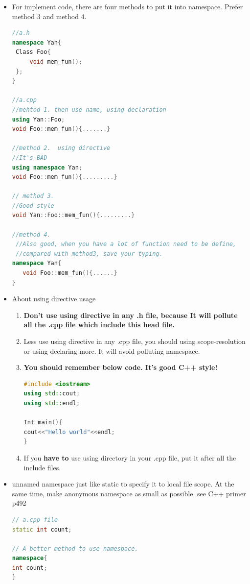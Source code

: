 \documentclass[a4paper,12pt,twoside]{book}
\begin{document}
\begin{itemize}
\item For implement code, there are four methods to put it into namespace. Prefer method 3 and method 4.

\begin{lstlisting}[frame=single, language=c++]
//a.h
namespace Yan{
 Class Foo{
     void mem_fun();
 };
}

//a.cpp
//mehtod 1. then use name, using declaration
using Yan::Foo;
void Foo::mem_fun(){.......}

//method 2.  using directive
//It's BAD
using namespace Yan;
void Foo::mem_fun(){.........}

// method 3.
//Good style
void Yan::Foo::mem_fun(){.........}

//method 4.
 //Also good, when you have a lot of function need to be define,
 //compared with method3, save your typing.
namespace Yan{
   void Foo::mem_fun(){......}
}
\end{lstlisting}

\item About using directive usage
\begin{enumerate}
\item  \textbf{Don't use using directive in any .h file,  because It will pollute all the .cpp file which include this head file.}

\item  Less use using directive in any .cpp file, you should using scope-resolution or using declaring more. It will avoid polluting namespace.

\item \textbf{You should remember below code. It's good C++ style!} 
\begin{lstlisting}[frame=single, language=c++]
#include <iostream>
using std::cout;
using std::endl;

Int main(){
cout<<"Hello world"<<endl;
}
\end{lstlisting}

\item If you \textbf{have to} use using directory in your .cpp file, put it after all the include files.
\end{enumerate}

\item unnamed namespace just like static to specify it to local file scope. At the same time, make anonymous namespace as small as possible.  see C++ primer p492
\begin{lstlisting}[frame=single, language=c++]
// a.cpp file
static int count;

// A better method to use namespace.
namespace{
int count;
}
\end{lstlisting}

\end{itemize}
\end{document}
